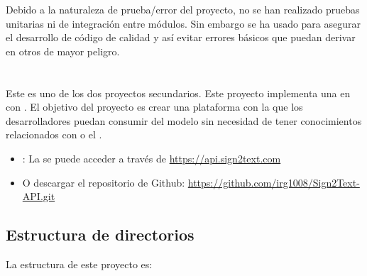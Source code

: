 Debido a la naturaleza de prueba/error del proyecto, no se han realizado pruebas unitarias ni de integración entre módulos. Sin embargo se ha usado  para asegurar el desarrollo de código de calidad y así evitar errores básicos que puedan derivar en otros de mayor peligro.


\section{}

Este es uno de los dos proyectos secundarios. Este proyecto implementa una  en  con . El objetivo del proyecto es crear una plataforma con la que los desarrolladores puedan consumir del modelo sin necesidad de tener conocimientos relacionados con  o el  .

\begin{itemize}
  \item {}: La  se puede acceder a través de \url{https://api.sign2text.com}
  \item O descargar el repositorio de Github: \url{https://github.com/irg1008/Sign2Text-API.git}
\end{itemize}


\subsection{Estructura de directorios}

La estructura de este proyecto es:

